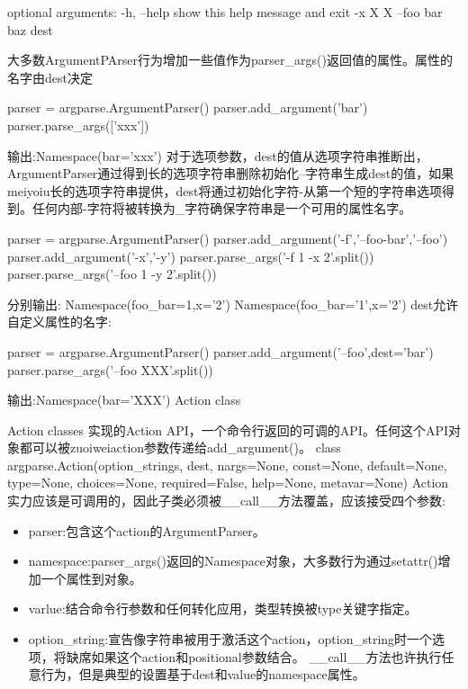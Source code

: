 optional arguments:\newline
 -h, --help     show this help message and exit\newline
 -x X X\newline
 --foo bar baz\newline
dest\par
大多数ArgumentPArser行为增加一些值作为parser\_args()返回值的属性。属性的名字由dest决定
\begin{python}
parser = argparse.ArgumentParser()
parser.add_argument('bar')
parser.parse_args(['xxx'])
\end{python}
输出:Namespace(bar='xxx')\newline
对于选项参数，dest的值从选项字符串推断出，ArgumentParser通过得到长的选项字符串删除初始化--字符串生成dest的值，如果meiyoiu长的选项字符串提供，dest将通过初始化字符-从第一个短的字符串选项得到。任何内部-字符将被转换为\_字符确保字符串是一个可用的属性名字。
\begin{python}
parser = argparse.ArgumentParser()
parser.add_argument('-f','--foo-bar','--foo')
parser.add_argument('-x','-y')
parser.parse_args('-f 1 -x 2'.split())
parser.parse_args('--foo 1 -y 2'.split())
\end{python}
分别输出:\newline
Namespace(foo\_bar=1,x='2')\newline
Namespace(foo\_bar='1',x='2')\newline
dest允许自定义属性的名字:
\begin{python}
parser = argparse.ArgumentParser()
parser.add_argument('--foo',dest='bar')
parser.parse_args('--foo XXX'.split())
\end{python}
输出:Namespace(bar='XXX')\newline
Action class\par
Action classes 实现的Action API，一个命令行返回的可调的API。任何这个API对象都可以被zuoiweiaction参数传递给add\_argument()。
class argparse.Action(option\_strings, dest, nargs=None, const=None, default=None, type=None, choices=None, required=False, help=None, metavar=None)
Action实力应该是可调用的，因此子类必须被\_\_call\_\_方法覆盖，应该接受四个参数:
\begin{itemize}
\item parser:包含这个action的ArgumentParser。
\item namespace:parser\_args()返回的Namespace对象，大多数行为通过setattr()增加一个属性到对象。
\item varlue:结合命令行参数和任何转化应用，类型转换被type关键字指定。
\item option\_string:宣告像字符串被用于激活这个action，option\_string时一个选项，将缺席如果这个action和positional参数结合。
\_\_call\_\_方法也许执行任意行为，但是典型的设置基于dest和value的namespace属性。
\end{itemize}
